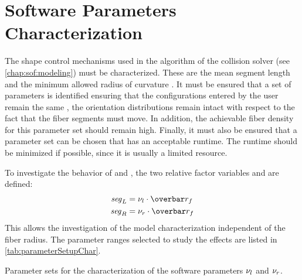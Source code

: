 \section{Software Parameters Characterization}\label{sec:modelSetup}
%
The shape control mechanisms used in the algorithm of the collision solver  (see \cref{chap:sof:modeling}) must be characterized.
These are the mean segment length \segLength{} and the minimum allowed radius of curvature \segRadius{}.
It must be ensured that a set of parameters is identified ensuring that the configurations entered by the user remain the same \ie{}, the orientation distributions remain intact with respect to the fact that the fiber segments must move.
In addition, the achievable fiber density for this parameter set should remain high.
Finally, it must also be ensured that a parameter set can be chosen that has an acceptable runtime.
The runtime should be minimized if possible, since it is usually a limited resource.
\par
%
To investigate the behavior of \segLength{} and \segRadius{}, the two relative factor variables \segLengthFactor{} and \segRadiusFactor{} are defined:
\begin{align}
    \begin{split}
        \segLength &= \segLengthFactor \cdot \fiberRadiusMean\\
        \segRadius &= \segRadiusFactor \cdot \fiberRadiusMean
    \end{split}
\end{align}
% 
This allows the investigation of the model characterization independent of the fiber radius.
The parameter ranges selected to study the effects are listed in \cref{tab:parameterSetupChar}.
%
\begin{table}[!b]
%
\centering
{}
\caption{Parameter sets for the characterization of the software parameters $\textnormal{$\nu_{l}$}$ and $\textnormal{$\nu_{r}$}$.}
\label{tab:parameterSetupChar}
\end{table}
